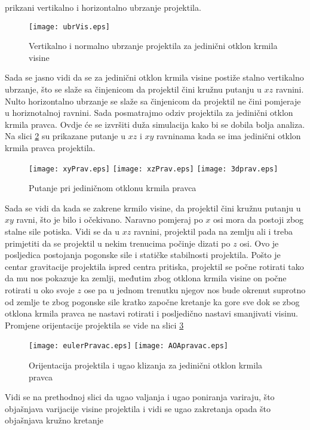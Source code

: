 prikzani vertikalno i horizontalno ubrzanje projektila.
\begin{figure}[!ht]
    \centering 
    \texttt{[image: ubrVis.eps]}
    \caption{Vertikalno i normalno ubrzanje projektila za jedinični otklon krmila visine}
    \label{fig:ubrVis}
\end{figure}
Sada se jasno vidi da se za jedinični otklon krmila visine postiže stalno vertikalno ubrzanje, što se slaže sa 
činjenicom da projektil čini kružnu putanju u $xz$ ravnini. Nulto horizontalno ubrzanje 
se slaže sa činjenicom da projektil ne čini pomjeraje u horiznotalnoj ravnini. 
Sada posmatrajmo odziv projektila za jedinični otklon krmila pravca. Ovdje će se izvršiti 
duža simulacija kako bi se dobila bolja analiza. Na slici \ref{fig:putanjePrav} su prikazane 
putanje u $xz$ i $xy$ ravninama kada se ima jedinični otklon krmila pravca projektila. 
\begin{figure}[!ht]
    \centering
    \texttt{[image: xyPrav.eps]}
    \texttt{[image: xzPrav.eps]}
    \texttt{[image: 3dprav.eps]}
    \caption{Putanje pri jediničnom otklonu krmila pravca}
    \label{fig:putanjePrav}
\end{figure}
Sada se vidi da kada se zakrene krmilo visine, da projektil čini kružnu putanju u $xy$ ravni, što je bilo 
i očekivano. Naravno pomjeraj po $x$ osi mora da postoji zbog stalne sile potiska. Vidi se da u 
$xz$ ravnini, projektil pada na zemlju ali i treba primjetiti da se projektil u nekim 
trenucima počinje dizati po $z$ osi. Ovo je posljedica postojanja pogonske sile i statičke stabilnosti projektila. 
Pošto je centar gravitacije projektila ispred centra pritiska, projektil se počne rotirati tako da mu nos 
pokazuje ka zemlji, međutim zbog otklona krmila visine on počne rotirati u oko svoje $z$ ose pa u jednom trenutku 
njegov nos bude okrenut suprotno od zemlje te zbog pogonske sile kratko započne kretanje ka gore sve dok se 
zbog otklona krmila pravca ne nastavi rotirati i posljedično nastavi smanjivati visinu. 
Promjene orijentacije projektila se vide na slici \ref{fig:eulerPravac}
\begin{figure}[!ht]
    \centering
    \texttt{[image: eulerPravac.eps]}
    \texttt{[image: AOApravac.eps]}
    \caption{Orijentacija projektila i ugao klizanja za jedinični otklon krmila pravca}
    \label{fig:eulerPravac}
\end{figure}
Vidi se na prethodnoj slici da ugao valjanja i ugao poniranja variraju, što objašnjava 
varijacije visine projektila i vidi se ugao zakretanja opada što objašnjava kružno kretanje 
